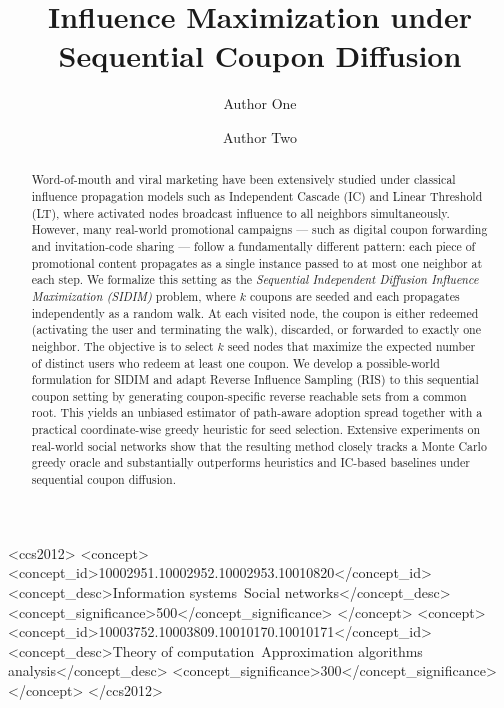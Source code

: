 \documentclass[sigconf]{acmart}
\begin{document}
\title{Influence Maximization under Sequential Coupon Diffusion}

\author{Author One}

\author{Author Two}
\authornotemark[1]

\renewcommand{\shortauthors}{Author One et al.}

\begin{abstract}
Word-of-mouth and viral marketing have been extensively studied under classical influence propagation models such as Independent Cascade (IC) and Linear Threshold (LT), where activated nodes broadcast influence to all neighbors simultaneously. However, many real-world promotional campaigns --- such as digital coupon forwarding and invitation-code sharing --- follow a fundamentally different pattern: each piece of promotional content propagates as a single instance passed to at most one neighbor at each step. We formalize this setting as the \emph{Sequential Independent Diffusion Influence Maximization (SIDIM)} problem, where $k$ coupons are seeded and each propagates independently as a random walk. At each visited node, the coupon is either redeemed (activating the user and terminating the walk), discarded, or forwarded to exactly one neighbor. The objective is to select $k$ seed nodes that maximize the expected number of distinct users who redeem at least one coupon. We develop a possible-world formulation for SIDIM and adapt Reverse Influence Sampling (RIS) to this sequential coupon setting by generating coupon-specific reverse reachable sets from a common root. This yields an unbiased estimator of path-aware adoption spread together with a practical coordinate-wise greedy heuristic for seed selection. Extensive experiments on real-world social networks show that the resulting method closely tracks a Monte Carlo greedy oracle and substantially outperforms heuristics and IC-based baselines under sequential coupon diffusion.
\end{abstract}

\begin{CCSXML}
<ccs2012>
 <concept>
  <concept_id>10002951.10002952.10002953.10010820</concept_id>
  <concept_desc>Information systems~Social networks</concept_desc>
  <concept_significance>500</concept_significance>
 </concept>
 <concept>
  <concept_id>10003752.10003809.10010170.10010171</concept_id>
  <concept_desc>Theory of computation~Approximation algorithms analysis</concept_desc>
  <concept_significance>300</concept_significance>
 </concept>
</ccs2012>
\end{CCSXML}
\end{document}
